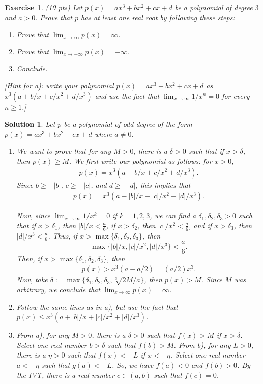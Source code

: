 \documentclass[12pt]{article}
\newcommand{\ra}{\rightarrow}
\theoremstyle{plain}
\newtheorem{exer}{\textbf{Exercise}}}
\theoremstyle{plain}
\newtheorem*{sol}{\textbf{Solution}}}
\theoremstyle{plain}
\theoremstyle{plain}
\begin{document}
\begin{exer}
(10 pts)
Let $p(x) = ax^3 + bx^2 + cx + d$ be a polynomial of degree $3$ and $a > 0$. Prove that $p$ has at least one real root by following these steps:
	\begin{enumerate}[label=\textbf{\alph*)}]
	\item Prove that $\lim_{x \ra \infty} p(x) = \infty$.
	\item Prove that $\lim_{x \ra -\infty} p (x) = -\infty$.
	\item Conclude.
	\end{enumerate}
[Hint for a): write your polynomial $p(x) = ax^3 + bx^2 + cx + d$ as $x^3 (a + b/x + c/x^2 + d/x^3)$ and use the fact that $\lim_{x \ra \infty} 1/x^n = 0$ for every $n \geq 1$.]
\end{exer}
\begin{sol}
Let $p$ be a polynomial of odd degree of the form $p(x) = a x^3 + bx^2 + cx + d$ where $a \neq 0$. 
\begin{enumerate}[label=\textbf{\alph*)}]
\item We want to prove that for any $M > 0$, there is a $\delta > 0$ such that if $x > \delta$, then $p(x) \geq M$. We first write our polynomial as follows: for $x > 0$,
	\begin{align*}
	p(x) = x^3 (a + b/x + c/x^2 + d/x^3) .
	\end{align*}
Since $b \geq -|b|$, $c \geq -|c|$, and $d \geq -|d|$, this implies that
	\begin{align*}
	p(x) = x^3 (a - |b|/x - |c|/x^2 - |d|/x^3) .
	\end{align*}

Now, since $\lim_{x \ra \infty} 1/x^k = 0$ if $k = 1, 2, 3$, we can find a $\delta_1, \delta_2, \delta_3  >0$ such that if $x > \delta_1$, then $|b|/x < \frac{a}{6}$, if $x > \delta_2$, then $|c|/x^2 < \frac{a}{6}$, and if $x > \delta_3$, then $|d|/x^3 < \frac{a}{6}$. Thus, if $x > \max \{ \delta_1 , \delta_2 , \delta_3 \}$, then
	$$
	\max \{ |b|/x , |c|/x^2 , |d|/x^3 \} < \frac{a}{6} .
	$$
Then, if $x > \max \{ \delta_1 , \delta_2 , \delta_3 \}$, then 
	\begin{align*}
	p(x) > x^3 (a - a/2) = (a/2)x^3 .
	\end{align*}
Now, take $\delta := \max \{\delta_1 , \delta_2 , \delta_3 , \sqrt[3]{2M/a} \}$, then $p(x) > M$. Since $M$ was arbitrary, we conclude that $\lim_{x \ra \infty} p(x) = \infty$.
\item Follow the same lines as in a), but use the fact that $p(x) \leq x^3 (a + |b|/x + |c|/x^2 + |d|/x^3)$.
\item From a), for any $M > 0$, there is a $\delta > 0$ such that $f(x) > M$ if $x > \delta$. Select one real number $b > \delta$ such that $f(b) > M$. From b), for any $L > 0$, there is a $\eta > 0$ such that $f(x) < -L$ if $x < -\eta$. Select one real number $a < -\eta$ such that $g(a) < -L$. So, we have $f(a) < 0$ and $f(b) > 0$. By the IVT, there is a real number $c \in (a, b)$ such that $f(c) = 0$.
\end{enumerate}
\end{sol}
\end{document}
